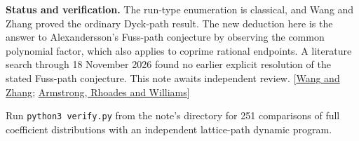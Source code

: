 \documentclass[11pt]{article}
\begin{document}
\small
\textbf{Status and verification.} The run-type enumeration is classical, and Wang and Zhang proved the ordinary Dyck-path result. The new deduction here is the answer to Alexandersson's Fuss-path conjecture by observing the common polynomial factor, which also applies to coprime rational endpoints. A literature search through 18 November 2026 found no earlier explicit resolution of the stated Fuss-path conjecture. This note awaits independent review. [\href{https://doi.org/10.37236/12375}{Wang and Zhang}; \href{https://www.combinatorics.org/ojs/index.php/eljc/article/view/v20i3p54}{Armstrong, Rhoades and Williams}]

Run \texttt{python3 verify.py} from the note's directory for 251 comparisons of full coefficient distributions with an independent lattice-path dynamic program.
\end{document}
